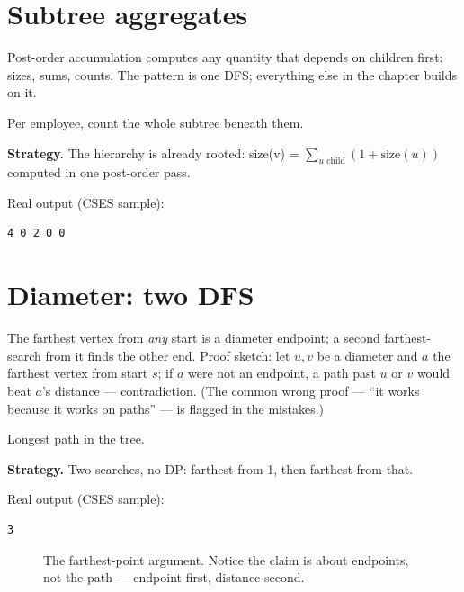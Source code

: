 \section{Subtree aggregates}\label{sec:subtree}
Post-order accumulation computes any quantity that depends on
children first: sizes, sums, counts. The pattern is one DFS;
everything else in the chapter builds on it.
\begin{example}\label{ex:subor}
Per employee, count the whole subtree beneath them.
\par\smallskip
\textbf{Strategy.} The hierarchy is already rooted: size(v) =
$\sum_{u\text{ child}}(1+\text{size}(u))$ computed in one post-order
pass.
\par\smallskip
\begin{solution}

Real output (CSES sample):
\begin{lstlisting}[numbers=none]
4 0 2 0 0
\end{lstlisting}
\end{solution}
\end{example}

\section{Diameter: two DFS}\label{sec:diam}
The farthest vertex from \emph{any} start is a diameter endpoint;
a second farthest-search from it finds the other end. Proof sketch:
let $u,v$ be a diameter and $a$ the farthest vertex from start $s$;
if $a$ were not an endpoint, a path past $u$ or $v$ would beat
$a$'s distance --- contradiction. (The common wrong proof --- ``it
works because it works on paths'' --- is flagged in the mistakes.)
\begin{example}\label{ex:diam}
Longest path in the tree.
\par\smallskip
\textbf{Strategy.} Two searches, no DP: farthest-from-1, then
farthest-from-that.
\par\smallskip
\begin{solution}

Real output (CSES sample):
\begin{lstlisting}[numbers=none]
3
\end{lstlisting}
\end{solution}
\end{example}
\begin{figure}[ht]\centering

\caption{The farthest-point argument. Notice the claim is about
endpoints, not the path --- endpoint first, distance second.}
\label{fig:twodfs}
\end{figure}

